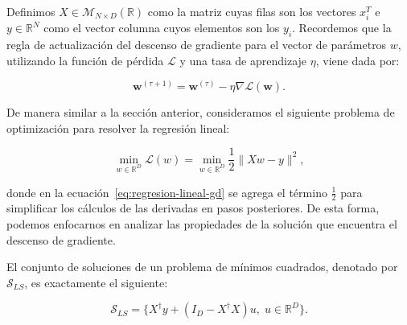 Definimos $X \in \mathcal{M}_{N \times D}(\mathbb{R})$ como la matriz cuyas filas son los vectores $x_{i}^{T}$ e $y \in \mathbb{R}^{N}$ como el vector columna cuyos elementos son los $y_i$. Recordemos que la regla de actualización del descenso de gradiente para el vector de parámetros $w$, utilizando la función de pérdida $\mathcal{L}$ y una tasa de aprendizaje $\eta$, viene dada por:

\begin{equation}
    \mathbf{w}^{(\tau + 1)} = \mathbf{w}^{(\tau)} - \eta \nabla \mathcal{L}(\mathbf{w}).
    \label{eq:descenso-gradiente2}
\end{equation}

De manera similar a la sección anterior, consideramos el siguiente problema de optimización para resolver la regresión lineal:

\begin{equation}\label{eq:regresion-lineal-gd}
    \min_{w \in \mathbb{R}^{D}} \mathcal{L}(w) = \min_{w \in \mathbb{R}^{D}} \frac{1}{2}\| Xw - y \|^{2},
\end{equation}

donde en la ecuación~\eqref{eq:regresion-lineal-gd} se agrega el término $\frac{1}{2}$ para simplificar los cálculos de las derivadas en pasos posteriores. De esta forma, podemos enfocarnos en analizar las propiedades de la solución que encuentra el descenso de gradiente.

\begin{teorema}
    El conjunto de soluciones de un problema de mínimos cuadrados, denotado por $\mathcal{S}_{LS}$, es exactamente el siguiente:

    \[
        \mathcal{S}_{LS} = \{ X^{\dagger}y + (I_D -X^{\dagger}X)u, \; u \in \mathbb{R}^{D} \}.
    \]
\end{teorema}

